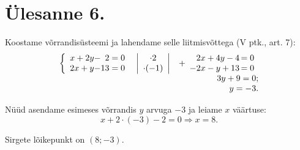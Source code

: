 \section{Ülesanne 6.}

\begin{solution}
Koostame võrrandisüsteemi ja lahendame selle liitmisvõttega (V ptk., art. 7):
\begin{displaymath}
\begin{array}{rr}
	\left\{
	\begin{array}{*{3}{r@{}}}
	 x + 2y&-&2=0  \\
	2x + y&-&13=0
	\end{array}
	\right.

	\quad

	\left|
		\begin{array}{c}
		\cdot2\\
		\cdot(-1) 
		\end{array}
	\right|&
	+
	\begin{array}{r@{\,}l}
		2x+4y-4 &=0\\
		-2x-y+13&=0
	\end{array} 
	\\
	& 3y+9=0;\\
	& y=-3.
\end{array}
\end{displaymath}

\end{solution}

Nüüd asendame esimeses võrrandis $y$ arvuga $-3$ ja leiame $x$ väärtuse:
\begin{displaymath}
x+2\cdot(-3)-2=0 \Rightarrow x=8.
\end{displaymath}

\begin{answer}
Sirgete lõikepunkt on $(8; -3)$.
\end{answer}
